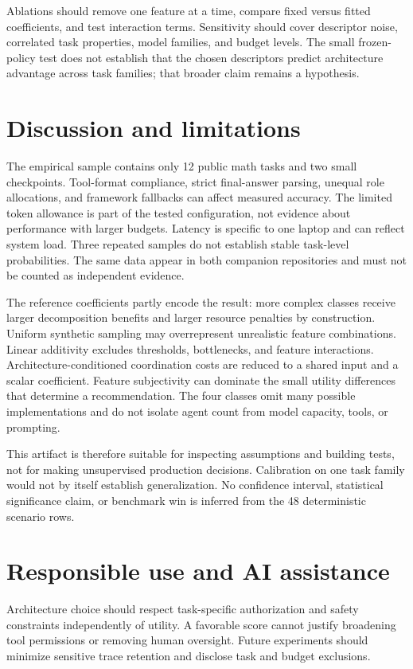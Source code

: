 \documentclass[11pt]{article}
\begin{document}
Ablations should remove one feature at a time, compare fixed versus fitted coefficients, and test interaction terms. Sensitivity should cover descriptor noise, correlated task properties, model families, and budget levels. The small frozen-policy test does not establish that the chosen descriptors predict architecture advantage across task families; that broader claim remains a hypothesis.

\section{Discussion and limitations}
The empirical sample contains only 12 public math tasks and two small checkpoints. Tool-format compliance, strict final-answer parsing, unequal role allocations, and framework fallbacks can affect measured accuracy. The limited token allowance is part of the tested configuration, not evidence about performance with larger budgets. Latency is specific to one laptop and can reflect system load. Three repeated samples do not establish stable task-level probabilities. The same data appear in both companion repositories and must not be counted as independent evidence.

The reference coefficients partly encode the result: more complex classes receive larger decomposition benefits and larger resource penalties by construction. Uniform synthetic sampling may overrepresent unrealistic feature combinations. Linear additivity excludes thresholds, bottlenecks, and feature interactions. Architecture-conditioned coordination costs are reduced to a shared input and a scalar coefficient. Feature subjectivity can dominate the small utility differences that determine a recommendation. The four classes omit many possible implementations and do not isolate agent count from model capacity, tools, or prompting.

This artifact is therefore suitable for inspecting assumptions and building tests, not for making unsupervised production decisions. Calibration on one task family would not by itself establish generalization. No confidence interval, statistical significance claim, or benchmark win is inferred from the 48 deterministic scenario rows.

\section{Responsible use and AI assistance}
Architecture choice should respect task-specific authorization and safety constraints independently of utility. A favorable score cannot justify broadening tool permissions or removing human oversight. Future experiments should minimize sensitive trace retention and disclose task and budget exclusions.
\end{document}
